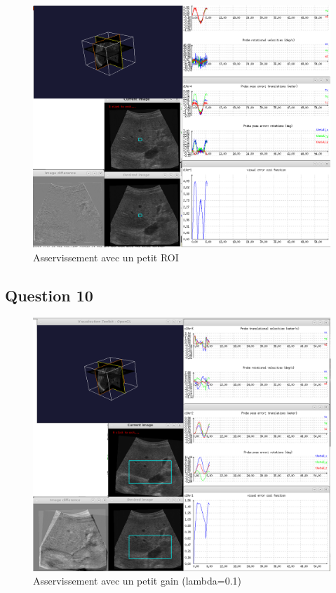 \documentclass[a4paper,11pt]{article}
\begin{document}
\begin{figure}[H]
    \centering
    \includegraphics[width=0.5\textheight]{./images/q9_small.png}
    \caption{Asservissement avec un petit ROI}
    \label{smallRoi}
\end{figure}

\subsection{Question 10}
\begin{figure}[H]
    \centering
    \includegraphics[width=1.0\textwidth]{./images/q10_small.png}
    \caption{Asservissement avec un petit gain (lambda=0.1)}
    \label{smallGain}
\end{figure}
\end{document}
